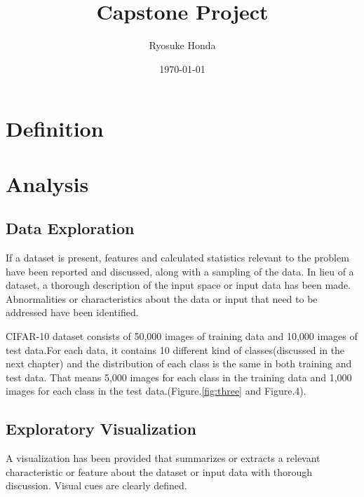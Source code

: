 \documentclass[a4paper,10pt,fleqn]{article}
\title{{\Huge Capstone Project}}%
\author{Ryosuke Honda}
\date{\today}
\begin{document}
\maketitle

\section{Definition}






\section{Analysis}
\subsection{Data Exploration}
If a dataset is present, features and calculated statistics relevant to the problem have been reported and discussed, along with a sampling of the data. In lieu of a dataset, a thorough description of the input space or input data has been made. Abnormalities or characteristics about the data or input that need to be addressed have been identified.


CIFAR-10 dataset consists of 50,000 images of training data and 10,000 images of test data.For each data, it contains 10 different kind of classes(discussed in the next chapter) and the distribution of each class is the same in both training and test data. That means 5,000 images for each class in the training data and 1,000 images for each class in the test data.(Figure.\ref{fig:three} and Figure.4). 


\subsection{Exploratory Visualization}
A visualization has been provided that summarizes or extracts a relevant characteristic or feature about the dataset or input data with thorough discussion. Visual cues are clearly defined.
\end{document}
